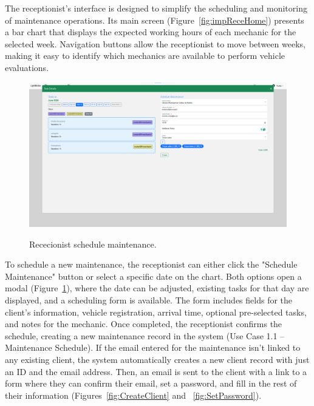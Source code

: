 The receptionist's interface is designed to simplify the scheduling and monitoring of maintenance operations. Its main screen (Figure~\ref{fig:impReceHome}) presents a bar chart that displays the expected working hours of each mechanic for the selected week. Navigation buttons allow the receptionist to move between weeks, making it easy to identify which mechanics are available to perform vehicle evaluations. 


\begin{figure}[h]
  \caption{Rececionist schedule maintenance.}
  \centering
  \includegraphics[width=\textwidth]{figs/Implementation/rececionist/addTask}
  \label{fig:impReceAddTask}
\end{figure}

To schedule a new maintenance, the receptionist can either click the "Schedule Maintenance" button or select a specific date on the chart. Both options open a modal (Figure~\ref{fig:impReceAddTask}), where the date can be adjusted, existing tasks for that day are displayed, and a scheduling form is available. The form includes fields for the client's information, vehicle registration, arrival time, optional pre-selected tasks, and notes for the mechanic. Once completed, the receptionist confirms the schedule, creating a new maintenance record in the system (Use Case 1.1 – Maintenance Schedule). If the email entered for the maintenance isn't linked to any existing client, the system automatically creates a new client record with just an ID and the email address. Then, an email is sent to the client with a link to a form where they can confirm their email, set a password, and fill in the rest of their information (Figures~\ref{fig:CreateClient} and ~\ref{fig:SetPassword}).

